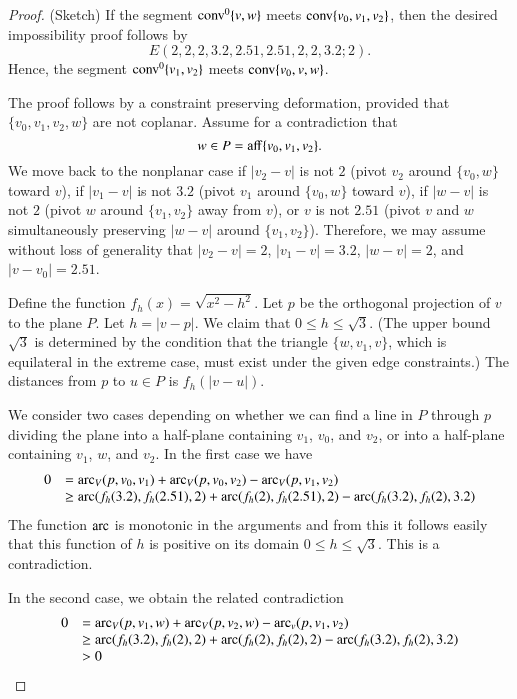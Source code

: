 \begin{proof} (Sketch)
If the segment ${\operatorname{conv}}^0\{v,w\}$ meets ${\operatorname{conv}}\{v_0,v_1,v_2\}$,
then the desired impossibility proof follows by
   $$
   E(2,2,2,  3.2,2.51,2.51,  2,2, 3.2; 2).
   $$
Hence, the segment ${\operatorname{conv}}^0\{v_1,v_2\}$ 
meets ${\operatorname{conv}}\{v_0,v,w\}$.

The proof
follows by a constraint preserving deformation, 
provided that $\{v_0,v_1,v_2,w\}$
are not coplanar. Assume for a contradiction that 
   $$
   w\in P={\operatorname{aff}}\{v_0,v_1,v_2\}.
   $$ 
We move back to the nonplanar case if
$|v_2-v|$ is not $2$ (pivot $v_2$ around $\{v_0,w\}$ toward $v$), if
$|v_1-v|$ is not $3.2$ (pivot $v_1$ around $\{v_0,w\}$ toward $v$), if
$|w-v|$ is not $2$ (pivot $w$ around $\{v_1,v_2\}$ away from $v$),
or $v$ is not $2.51$ (pivot $v$ and $w$ simultaneously preserving
$|w-v|$ around $\{v_1,v_2\}$).  Therefore, we may assume without
loss of generality that $|v_2-v|=2$, $|v_1-v|=3.2$, $|w-v|=2$, and
$|v-v_0|=2.51$.

Define the function $f_h(x)=\sqrt{x^2-h^2}$.
Let $p$ be the orthogonal projection of $v$ to the plane $P$.  Let
$h=|v-p|$. We claim that $0\le h \le\sqrt3$.
(The upper bound
$\sqrt3$ is determined by the condition that the triangle
$\{w,v_1,v\}$, which is equilateral in the extreme case, must exist under
the given edge constraints.)
The distances from $p$ to $u\in P$ is
$f_h(|v-u|)$. 

We consider two cases depending
on whether we can find a line in $P$ through $p$ dividing the
plane into a half-plane containing $v_1$, $v_0$, and $v_2$, or into
a half-plane containing $v_1$, $w$, and $v_2$.  In the first case
we have
 $$
\begin{array}{lll}
    0&=\operatorname{arc}_V(p,v_0,v_1)+
    \operatorname{arc}_V(p,v_0,v_2)- \operatorname{arc}_V(p,v_1,v_2)\\
    &\ge \operatorname{arc}(f_h(3.2),f_h(2.51),2)+
    \operatorname{arc}(f_h(2),f_h(2.51),2)-\operatorname{arc}(f_h(3.2),f_h(2),3.2)
\end{array}
 $$
The function $\operatorname{arc}$ is monotonic in the arguments and from this it
follows easily that this function of $h$ is positive on its domain
$0\le h\le \sqrt3$. This is a contradiction.  

In the second case, we obtain the
related contradiction
  $$
\begin{array}{lll}
    0&=\operatorname{arc}_V(p,v_1,w)+
    \operatorname{arc}_V(p,v_2,w)-
    \operatorname{arc}_v(p,v_1,v_2)\\
    &\ge \operatorname{arc}(f_h(3.2),f_h(2),2)+
    \operatorname{arc}(f_h(2),f_h(2),2)-\operatorname{arc}(f_h(3.2),f_h(2),3.2)\\
    &>0
\end{array}
  $$
\end{proof}

